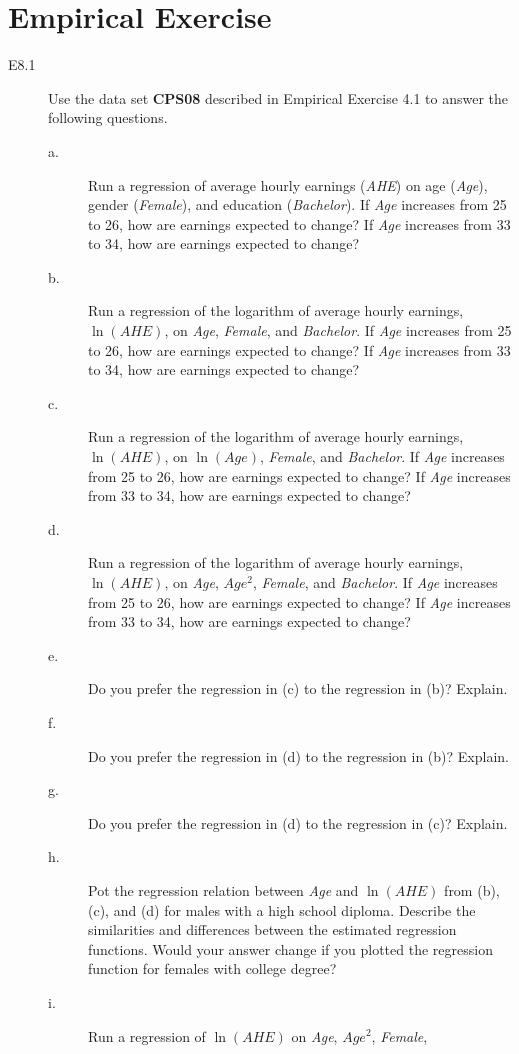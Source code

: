 \documentclass[a4paper,11pt]{article}
\begin{document}
\section*{Empirical Exercise}
\label{sec:org9458d2e}
\begin{description}
\item[{E8.1}] Use the data set \textbf{CPS08} described in Empirical Exercise 4.1
to answer the following questions.
\begin{description}
\item[{a.}] Run a regression of average hourly earnings (\emph{AHE}) on age
(\emph{Age}), gender (\emph{Female}), and education (\emph{Bachelor}). If
\emph{Age} increases from 25 to 26, how are earnings expected to
change? If \emph{Age} increases from 33 to 34, how are earnings
expected to change?
\item[{b.}] Run a regression of the logarithm of average hourly
earnings, \(\ln(AHE)\), on \emph{Age}, \emph{Female}, and \emph{Bachelor}. If
\emph{Age} increases from 25 to 26, how are earnings expected to
change? If \emph{Age} increases from 33 to 34, how are earnings
expected to change?
\item[{c.}] Run a regression of the logarithm of average hourly
earnings, \(\ln(AHE)\), on \(\ln(Age)\), \emph{Female}, and
\emph{Bachelor}. If \emph{Age} increases from 25 to 26, how are
earnings expected to change? If \emph{Age} increases from 33 to
34, how are earnings expected to change?
\item[{d.}] Run a regression of the logarithm of average hourly
earnings, \(\ln(AHE)\), on \emph{Age}, \(Age^2\), \emph{Female}, and
\emph{Bachelor}. If \emph{Age} increases from 25 to 26, how are
earnings expected to change? If \emph{Age} increases from 33 to
34, how are earnings expected to change?
\item[{e.}] Do you prefer the regression in (c) to the regression in
(b)? Explain.
\item[{f.}] Do you prefer the regression in (d) to the regression in
(b)? Explain.
\item[{g.}] Do you prefer the regression in (d) to the regression in
(c)? Explain.
\item[{h.}] Pot the regression relation between \emph{Age} and \(\ln(AHE)\)
from (b), (c), and (d) for males with a high school
diploma. Describe the similarities and differences between
the estimated regression functions. Would your answer change
if you plotted the regression function for females with
college degree?
\item[{i.}] Run a regression of \(\ln(AHE)\) on \emph{Age}, \(Age^2\), \emph{Female},

\end{description}
\end{description}
\end{document}
